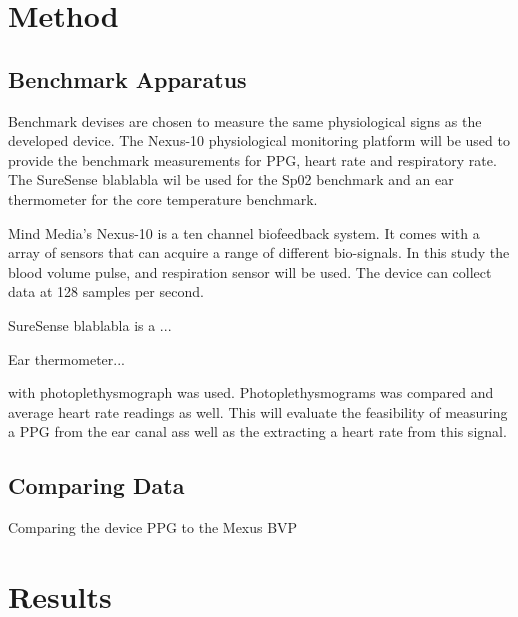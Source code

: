 \section{Method}
\subsection{Benchmark Apparatus}
Benchmark devises are chosen to measure the same physiological signs as the developed device. The Nexus-10 physiological monitoring platform will be used to provide the benchmark measurements for PPG, heart rate and respiratory rate. The SureSense blablabla wil be used for the Sp02 benchmark and an ear thermometer for the core temperature benchmark.

Mind Media's Nexus-10 is a ten channel biofeedback system. It comes with a array of sensors that can acquire a range of different bio-signals. In this study the blood volume pulse, and respiration sensor will be used. The device can collect data at 128 samples per second. 

SureSense blablabla is a ...

Ear thermometer...

with photoplethysmograph was used. Photoplethysmograms was compared and average heart rate readings as well. This will evaluate the feasibility of measuring a PPG from the ear canal ass well as the extracting a heart rate from this signal.

\subsection{Comparing Data}
Comparing the device PPG to the Mexus BVP


\section{Results}


